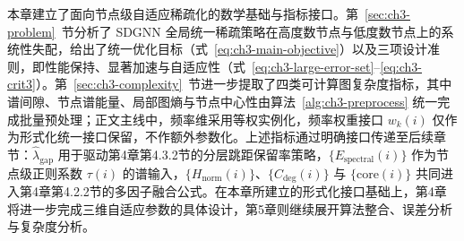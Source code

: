 本章建立了面向节点级自适应稀疏化的数学基础与指标接口。第~\ref{sec:ch3-problem}~节分析了 SDGNN 全局统一稀疏策略在高度数节点与低度数节点上的系统性失配，给出了统一优化目标（式~\eqref{eq:ch3-main-objective}）以及三项设计准则，即性能保持、显著加速与自适应性（式~\eqref{eq:ch3-large-error-set}--\eqref{eq:ch3-crit3}）。第~\ref{sec:ch3-complexity}~节进一步提取了四类可计算图复杂度指标，其中谱间隙、节点谱能量、局部图熵与节点中心性由算法~\ref{alg:ch3-preprocess} 统一完成批量预处理；正文主线中，频率维采用等权实例化，频率权重接口 $w_k(i)$ 仅作为形式化统一接口保留，不作额外参数化。上述指标通过明确接口传递至后续章节：$\hat{\lambda}_\text{gap}$ 用于驱动第4章第4.3.2节的分层跳距保留率策略，$\{E_\text{spectral}(i)\}$ 作为节点级正则系数 $\tau(i)$ 的谱输入，$\{H_\text{norm}(i)\}$、$\{C_\text{deg}(i)\}$ 与 $\{\text{core}(i)\}$ 共同进入第4章第4.2.2节的多因子融合公式。在本章所建立的形式化接口基础上，第4章将进一步完成三维自适应参数的具体设计，第5章则继续展开算法整合、误差分析与复杂度分析。


